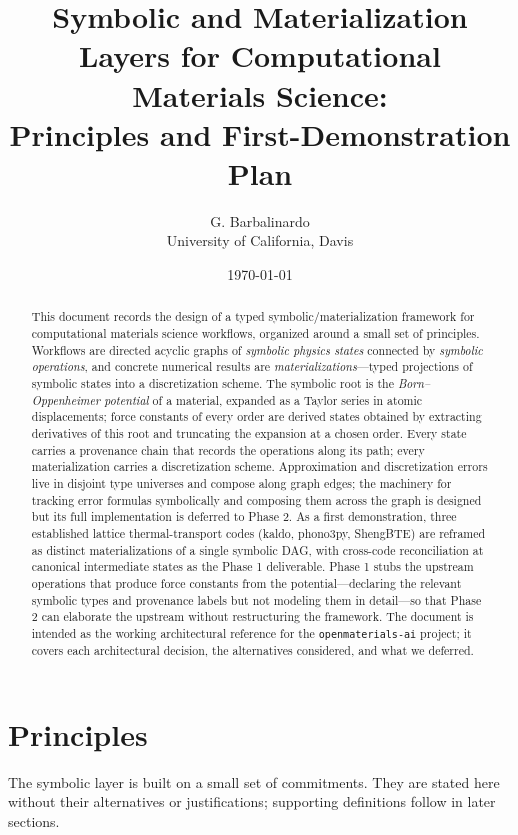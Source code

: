 \documentclass[11pt,a4paper]{article}
\title{Symbolic and Materialization Layers for Computational Materials Science:\\
       Principles and First-Demonstration Plan}
\author{G. Barbalinardo \\
        \small University of California, Davis}
\date{\today}
\begin{document}
\maketitle

\begin{abstract}
This document records the design of a typed symbolic/materialization framework for computational materials science
workflows, organized around a small set of principles. Workflows are directed
acyclic graphs of \emph{symbolic physics states} connected by \emph{symbolic operations}, and
concrete numerical results are \emph{materializations}---typed projections of symbolic states
into a discretization scheme. The symbolic root is the \emph{Born--Oppenheimer
potential} of a material, expanded as a Taylor series in atomic displacements; force constants
of every order are derived states obtained by extracting derivatives of this root and truncating
the expansion at a chosen order. Every state carries a provenance chain that records the
operations along its path; every materialization carries a discretization scheme. Approximation
and discretization errors live in disjoint type universes and compose along graph edges; the
machinery for tracking error formulas symbolically and composing them across the graph is
designed but its full implementation is deferred to Phase 2. As a first demonstration, three
established lattice thermal-transport codes (kaldo, phono3py, ShengBTE) are reframed as distinct
materializations of a single symbolic DAG, with cross-code reconciliation at canonical
intermediate states as the Phase 1 deliverable. Phase 1 stubs the upstream operations that
produce force constants from the potential---declaring the relevant symbolic types and provenance
labels but not modeling them in detail---so that Phase 2 can elaborate the upstream without
restructuring the framework. The document is intended as the working architectural reference for
the \texttt{openmaterials-ai} project; it covers each architectural decision, the alternatives
considered, and what we deferred.
\end{abstract}

\tableofcontents

\bigskip

\section{Principles}
\label{sec:principles}

The symbolic layer is built on a small set of commitments. They are stated here without
their alternatives or justifications; supporting definitions follow in later sections.
\end{document}

